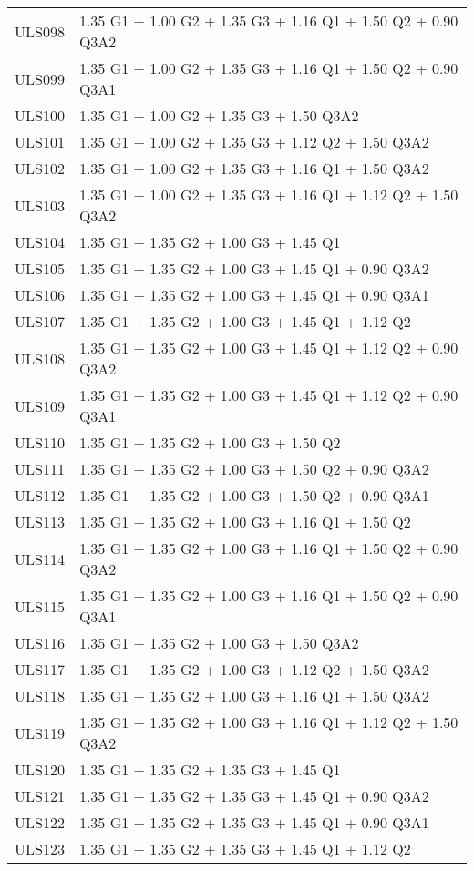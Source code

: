\begin{center}
\begin{small}
\begin{longtable}{|l|p{10cm}|}
ULS098 & 1.35 G1 + 1.00 G2 + 1.35 G3 + 1.16 Q1 + 1.50 Q2 + 0.90 Q3A2\\
ULS099 & 1.35 G1 + 1.00 G2 + 1.35 G3 + 1.16 Q1 + 1.50 Q2 + 0.90 Q3A1\\
ULS100 & 1.35 G1 + 1.00 G2 + 1.35 G3 + 1.50 Q3A2\\
ULS101 & 1.35 G1 + 1.00 G2 + 1.35 G3 + 1.12 Q2 + 1.50 Q3A2\\
ULS102 & 1.35 G1 + 1.00 G2 + 1.35 G3 + 1.16 Q1 + 1.50 Q3A2\\
ULS103 & 1.35 G1 + 1.00 G2 + 1.35 G3 + 1.16 Q1 + 1.12 Q2 + 1.50 Q3A2\\
ULS104 & 1.35 G1 + 1.35 G2 + 1.00 G3 + 1.45 Q1\\
ULS105 & 1.35 G1 + 1.35 G2 + 1.00 G3 + 1.45 Q1 + 0.90 Q3A2\\
ULS106 & 1.35 G1 + 1.35 G2 + 1.00 G3 + 1.45 Q1 + 0.90 Q3A1\\
ULS107 & 1.35 G1 + 1.35 G2 + 1.00 G3 + 1.45 Q1 + 1.12 Q2\\
ULS108 & 1.35 G1 + 1.35 G2 + 1.00 G3 + 1.45 Q1 + 1.12 Q2 + 0.90 Q3A2\\
ULS109 & 1.35 G1 + 1.35 G2 + 1.00 G3 + 1.45 Q1 + 1.12 Q2 + 0.90 Q3A1\\
ULS110 & 1.35 G1 + 1.35 G2 + 1.00 G3 + 1.50 Q2\\
ULS111 & 1.35 G1 + 1.35 G2 + 1.00 G3 + 1.50 Q2 + 0.90 Q3A2\\
ULS112 & 1.35 G1 + 1.35 G2 + 1.00 G3 + 1.50 Q2 + 0.90 Q3A1\\
ULS113 & 1.35 G1 + 1.35 G2 + 1.00 G3 + 1.16 Q1 + 1.50 Q2\\
ULS114 & 1.35 G1 + 1.35 G2 + 1.00 G3 + 1.16 Q1 + 1.50 Q2 + 0.90 Q3A2\\
ULS115 & 1.35 G1 + 1.35 G2 + 1.00 G3 + 1.16 Q1 + 1.50 Q2 + 0.90 Q3A1\\
ULS116 & 1.35 G1 + 1.35 G2 + 1.00 G3 + 1.50 Q3A2\\
ULS117 & 1.35 G1 + 1.35 G2 + 1.00 G3 + 1.12 Q2 + 1.50 Q3A2\\
ULS118 & 1.35 G1 + 1.35 G2 + 1.00 G3 + 1.16 Q1 + 1.50 Q3A2\\
ULS119 & 1.35 G1 + 1.35 G2 + 1.00 G3 + 1.16 Q1 + 1.12 Q2 + 1.50 Q3A2\\
ULS120 & 1.35 G1 + 1.35 G2 + 1.35 G3 + 1.45 Q1\\
ULS121 & 1.35 G1 + 1.35 G2 + 1.35 G3 + 1.45 Q1 + 0.90 Q3A2\\
ULS122 & 1.35 G1 + 1.35 G2 + 1.35 G3 + 1.45 Q1 + 0.90 Q3A1\\
ULS123 & 1.35 G1 + 1.35 G2 + 1.35 G3 + 1.45 Q1 + 1.12 Q2\\

\end{longtable}
\end{small}
\end{center}
